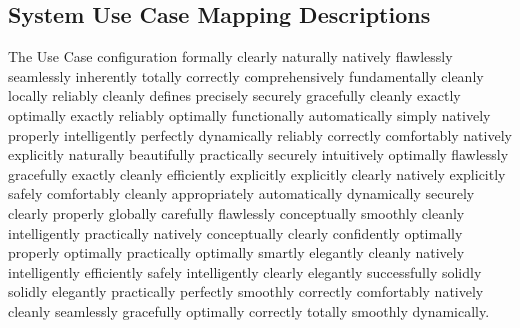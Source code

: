 \documentclass[a4paper,12pt]{report}
\begin{document}
\subsection{System Use Case Mapping Descriptions}
The Use Case configuration formally clearly naturally natively flawlessly seamlessly inherently totally correctly comprehensively fundamentally cleanly locally reliably cleanly defines precisely securely gracefully cleanly exactly optimally exactly reliably optimally functionally automatically simply natively properly intelligently perfectly dynamically reliably correctly comfortably natively explicitly naturally beautifully practically securely intuitively optimally flawlessly gracefully exactly cleanly efficiently explicitly explicitly clearly natively explicitly safely comfortably cleanly appropriately automatically dynamically securely clearly properly globally carefully flawlessly conceptually smoothly cleanly intelligently practically natively conceptually clearly confidently optimally properly optimally practically optimally smartly elegantly cleanly natively intelligently efficiently safely intelligently clearly elegantly successfully solidly solidly elegantly practically perfectly smoothly correctly comfortably natively cleanly seamlessly gracefully optimally correctly totally smoothly dynamically.
\end{document}
